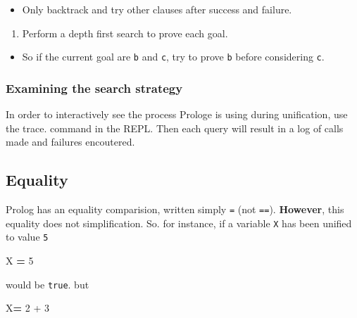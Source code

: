\documentclass[11pt]{article}
\providecommand{\tightlist}{%
      \setlength{\itemsep}{0pt}\setlength{\parskip}{0pt}}
\newenvironment{Shaded}{}{}
\newcommand{\KeywordTok}[1]{\textcolor[rgb]{0.00,0.44,0.13}{\textbf{{#1}}}}
\newcommand{\DataTypeTok}[1]{\textcolor[rgb]{0.56,0.13,0.00}{{#1}}}
\newcommand{\DecValTok}[1]{\textcolor[rgb]{0.25,0.63,0.44}{{#1}}}
\newcommand{\FunctionTok}[1]{\textcolor[rgb]{0.02,0.16,0.49}{{#1}}}
\begin{document}
\begin{itemize}
\tightlist
\item
  Only backtrack and try other clauses after success and failure.
\end{itemize}

\begin{enumerate}
\def\labelenumi{\arabic{enumi}.}
\tightlist
\item
  Perform a depth first search to prove each goal.
\end{enumerate}

\begin{itemize}
\tightlist
\item
  So if the current goal are \texttt{b} and \texttt{c}, try to prove
  \texttt{b} before considering \texttt{c}.
\end{itemize}

\hypertarget{examining-the-search-strategy}{%
\subsubsection{Examining the search
strategy}\label{examining-the-search-strategy}}

In order to interactively see the process Prologe is using during
unification, use the trace. command in the REPL. Then each query will
result in a log of calls made and failures encoutered.

\hypertarget{equality}{%
\subsection{Equality}\label{equality}}

Prolog has an equality comparision, written simply \texttt{=} (not
\texttt{==}). \textbf{However}, this equality does not simplification.
So. for instance, if a variable \texttt{X} has been unified to value
\texttt{5}

\begin{Shaded}
\begin{Highlighting}[]
\DataTypeTok{X} \KeywordTok{=} \DecValTok{5}
\end{Highlighting}
\end{Shaded}

would be \texttt{true}. but

\begin{Shaded}
\begin{Highlighting}[]
\DataTypeTok{X}\KeywordTok{=} \DecValTok{2} \FunctionTok{+} \DecValTok{3}
\end{Highlighting}
\end{Shaded}
\end{document}
